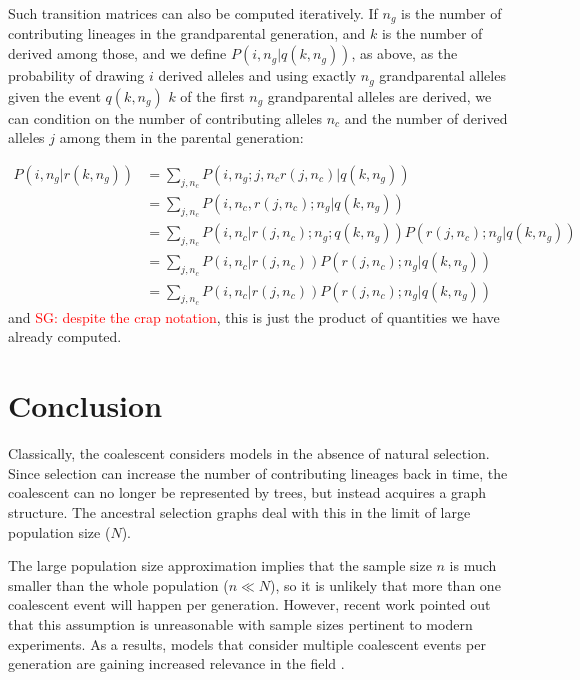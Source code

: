 \documentclass[review]{elsarticle}
\newcommand{\sgcomment}[1]{\textcolor{red}{SG: #1}}
\begin{document}
Such transition matrices can also be computed iteratively. If  $n_g$ is the number of contributing 
lineages in the grandparental generation, and $k$ is the number of derived among those, and we define 
 $P(i, n_g | q(k, n_g))$, as above, as the probability of drawing $i$ derived alleles and using exactly $n_g$
 grandparental alleles given the event $q(k, n_g)$ $k$ of the first $n_g$ grandparental alleles are derived, we can 
 condition on the number of contributing alleles $n_c$ and the number of derived alleles $j$ among them in the parental generation:
 
 \begin{equation}
 \begin{split}
 P(i, n_g | r(k, n_g)) & = \sum_{j,n_c} P(i, n_g ; j, n_c r(j,n_c)  | q(k, n_g))\\
 &= \sum_{j,n_c} P(i, n_c,  r(j,n_c); n_g  | q(k, n_g))\\
 &= \sum_{j,n_c} P(i, n_c|   r(j,n_c); n_g  ; q(k, n_g))  P(r(j,n_c); n_g  | q(k, n_g))\\
 &= \sum_{j,n_c} P(i, n_c |   r(j,n_c))  P( r(j,n_c); n_g  | q(k, n_g))\\
 &= \sum_{j,n_c} P(i, n_c |   r(j,n_c))  P( r(j,n_c); n_g  | q(k, n_g))
 \end{split}
\end{equation}
and \sgcomment{despite the crap notation}, this is just the product of quantities we have already computed.


\section{Conclusion}
\label{sec:conclusion}

Classically, the coalescent considers models in the absence of natural selection. Since selection
can increase the number of contributing lineages back in time, the coalescent can no longer be
represented by trees, but instead acquires a graph structure. The ancestral selection graphs
\citep{KroneNeuhauser1997} deal with this in the limit of large population size ($N$).

The large population size approximation implies that the sample size $n$ is much smaller than the
whole population ($n \ll N$), so it is unlikely that more than one coalescent event will happen per
generation. However, recent work \citep{BhaskarEtAl2014,NelsonEtAl2019} pointed out that this
assumption is unreasonable with sample sizes pertinent to modern experiments. As a results, models
that consider multiple coalescent events per generation are gaining increased relevance in the
field \citep{FlemmingtonVoit}.
\end{document}
